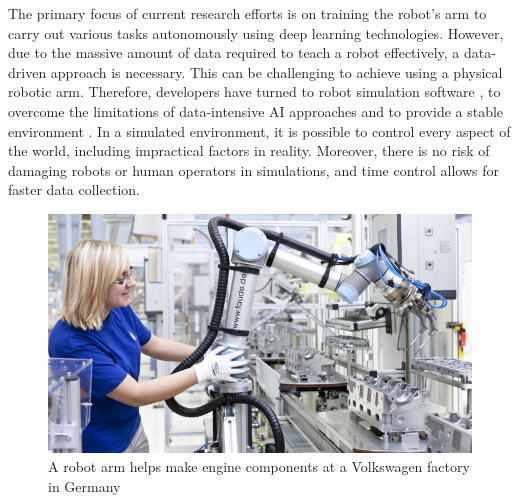 \documentclass[12pt,oneside]{article}
\begin{document}
The primary focus of current research efforts is on training the robot’s arm to carry out various tasks autonomously using deep learning technologies. However, due to the massive amount of data required to teach a robot effectively, a data-driven approach is necessary. This can be challenging to achieve using a physical robotic arm. Therefore, developers have turned to robot simulation software \cite{12_oRobotics}, \cite{13_pybullet} to overcome the limitations of data-intensive AI approaches and to provide a stable environment \cite{14_banks1999introduction}. In a simulated environment, it is possible to control every aspect of the world, including impractical factors in reality. Moreover, there is no risk of damaging robots or human operators in simulations, and time control allows for faster data collection.

\begin{figure}[H]
\centering
\includegraphics[width=0.7\linewidth]{robotic_arm_real_world}
\caption{A robot arm helps make engine components at a Volkswagen factory in Germany \cite{wamu2013}}
\label{fig:roboticarmrealworld}
\end{figure}
\end{document}

